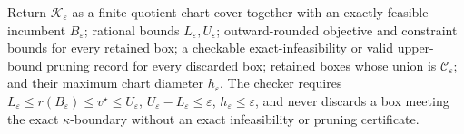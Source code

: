 Return \(\mathscr K_{\varepsilon}\) as a finite quotient-chart cover together with an exactly feasible incumbent \(B_{\varepsilon}\); rational bounds \(L_{\varepsilon},U_{\varepsilon}\); outward-rounded objective and constraint bounds for every retained box; a checkable exact-infeasibility or valid upper-bound pruning record for every discarded box; retained boxes whose union is \(\mathcal C_\varepsilon\); and their maximum chart diameter \(h_{\varepsilon}\). The checker requires \(L_{\varepsilon}\le r(B_{\varepsilon})\le v^\star\le U_{\varepsilon}\), \(U_{\varepsilon}-L_{\varepsilon}\le\varepsilon\), \(h_{\varepsilon}\le\varepsilon\), and never discards a box meeting the exact \(\kappa\)-boundary without an exact infeasibility or pruning certificate.